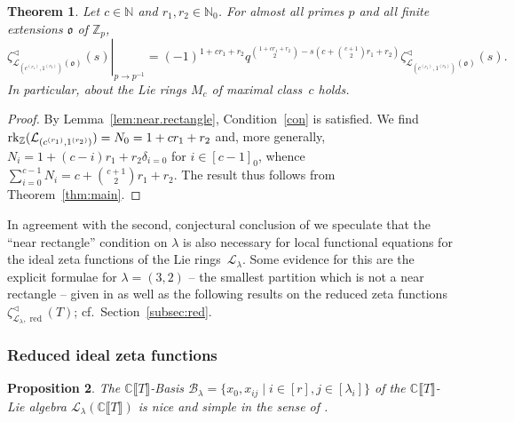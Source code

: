 \documentclass[11pt]{amsart}
\numberwithin{equation}{section}
\numberwithin{figure}{section}
\theoremstyle{plain}
\newtheorem{theorem}{Theorem}[section]
\newtheorem{proposition}[theorem]{Proposition}
\theoremstyle{definition}
\theoremstyle{remark}
\begin{document}
\begin{theorem}\label{cor:rectangle}
  Let $c\in{\ensuremath{\mathbb{N}}}$ and $r_1,r_2\in{\ensuremath{\mathbb{N}}}_0$. For almost all primes $p$ and all
  finite extensions ${\mathfrak o}$ of ${\ensuremath{\mathbb{Z}_p}}$,
$$\left. \zeta^{\triangleleft}_{{\ensuremath{\mathcal{L}}}_{(c^{(r_1)},
      1^{(r_2)})}({\mathfrak o})}(s)\right|_{p{\rightarrow} p^{-1}} =
  (-1)^{1+cr_1+r_2}q^{\binom{1+cr_1+r_2}{2} - s\left( c +
    \binom{c+1}{2}r_1 + r_2\right)} \zeta^{\triangleleft}_{{\ensuremath{\mathcal{L}}}_{(c^{(r_1)},
      1^{(r_2)})}({\mathfrak o})}(s).$$ In particular,
  \cite[Conjecture~4.24]{duSWoodward/08} about the Lie rings
  $M_c$ of maximal class~$c$ holds.
\end{theorem}

\begin{proof} 
 By Lemma~\ref{lem:near.rectangle}, Condition~\ref{con} is
 satisfied. We find ${\ensuremath{{\rm rk}}}_{\ensuremath{\mathbb{Z}}}({\ensuremath{\mathcal{L}}}_{(c^{(r_1)},1^{(r_2)})}) = N_0 = 1
 + cr_1 + r_2$ and, more generally, $N_i = 1 + (c-i)r_1 + r_2
 \delta_{i=0}$ for $i\in[c-1]_0$, whence $\sum_{i=0}^{c-1}N_i = c +
 \binom{c+1}{2}r_1 + r_2$. The result thus follows from
 Theorem~\ref{thm:main}.
\end{proof}

In agreement with the second, conjectural conclusion of
\cite[Proposition 4.75]{duSWoodward/08} we speculate that the ``near
rectangle'' condition on $\lambda$ is also necessary for local
functional equations for the ideal zeta functions of the Lie
rings~${\ensuremath{\mathcal{L}}}_{\lambda}$. Some evidence for this are the explicit
formulae for $\lambda=(3,2)$ -- the smallest partition which is not a
near rectangle -- given in \cite[Theorem~2.32]{duSWoodward/08} as well
as the following results on the reduced zeta
functions~$\zeta^{\triangleleft}_{{\ensuremath{\mathcal{L}}}_{\lambda},\operatorname{red}}(T)$;
cf.\ Section~\ref{subsec:red}.

\subsubsection{Reduced ideal zeta functions}
\begin{proposition}\label{prop:nice&simple}
  The ${\mathbb{C}\llbracket T \rrbracket}$-Basis ${\mathcal{B}}_{\lambda} = \{ x_0, x_{ij} \mid i\in [r], j\in
  [\lambda_i] \}$ of the ${\mathbb{C}\llbracket T \rrbracket}$-Lie algebra ${\ensuremath{\mathcal{L}}}_\lambda({\mathbb{C}\llbracket T \rrbracket})$ is nice
  and simple in the sense of \cite{Evseev/09}.
\end{proposition}
\end{document}

